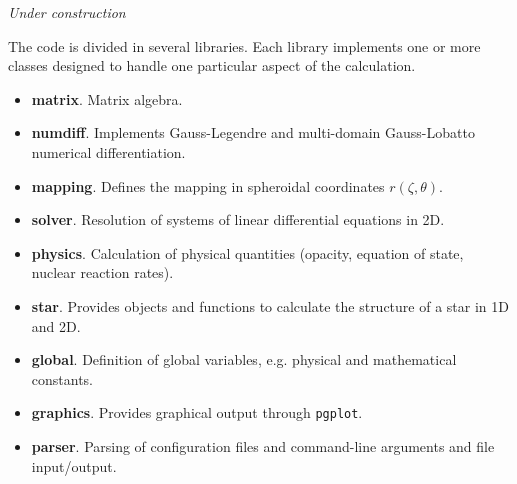 {\it Under construction}

\bigskip
\bigskip
The code is divided in several libraries. Each library implements one or
more classes designed to handle one particular aspect of the calculation.

\begin{itemize}
\item {\bf matrix}. Matrix algebra.

\item {\bf numdiff}. Implements Gauss-Legendre and multi-domain
Gauss-Lobatto numerical differentiation.

\item {\bf mapping}. Defines the mapping in spheroidal coordinates
$r(\zeta,\theta)$.

\item {\bf solver}. Resolution of systems of linear differential equations
in 2D.

\item {\bf physics}. Calculation of physical quantities (opacity,
equation of state, nuclear reaction rates).

\item {\bf star}. Provides objects and functions to calculate the
structure of a star in 1D and 2D.

\item {\bf global}. Definition of global variables, e.g. physical and mathematical constants.

\item {\bf graphics}. Provides graphical output through {\tt pgplot}.
\item {\bf parser}. Parsing of configuration files and command-line
arguments and file input/output.

\end{itemize} 


